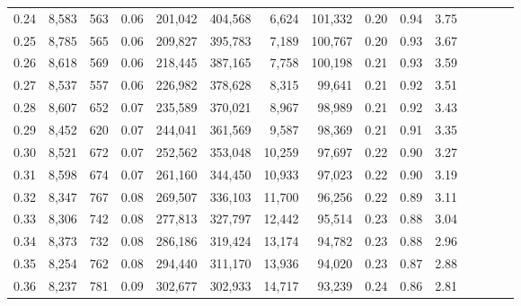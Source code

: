 \begin{tabular}{rrrcrrrrrrrrrrr}
0.24 &  8,583 &    563 &                                       0.06 &  201,042 &  404,568 &    6,624 &  101,332 &  0.20 &  0.94 &                         3.75 \\
0.25 &  8,785 &    565 &                                       0.06 &  209,827 &  395,783 &    7,189 &  100,767 &  0.20 &  0.93 &                         3.67 \\
0.26 &  8,618 &    569 &                                       0.06 &  218,445 &  387,165 &    7,758 &  100,198 &  0.21 &  0.93 &                         3.59 \\
0.27 &  8,537 &    557 &                                       0.06 &  226,982 &  378,628 &    8,315 &   99,641 &  0.21 &  0.92 &                         3.51 \\
0.28 &  8,607 &    652 &                                       0.07 &  235,589 &  370,021 &    8,967 &   98,989 &  0.21 &  0.92 &                         3.43 \\
0.29 &  8,452 &    620 &                                       0.07 &  244,041 &  361,569 &    9,587 &   98,369 &  0.21 &  0.91 &                         3.35 \\
0.30 &  8,521 &    672 &                                       0.07 &  252,562 &  353,048 &   10,259 &   97,697 &  0.22 &  0.90 &                         3.27 \\
0.31 &  8,598 &    674 &                                       0.07 &  261,160 &  344,450 &   10,933 &   97,023 &  0.22 &  0.90 &                         3.19 \\
0.32 &  8,347 &    767 &                                       0.08 &  269,507 &  336,103 &   11,700 &   96,256 &  0.22 &  0.89 &                         3.11 \\
0.33 &  8,306 &    742 &                                       0.08 &  277,813 &  327,797 &   12,442 &   95,514 &  0.23 &  0.88 &                         3.04 \\
0.34 &  8,373 &    732 &                                       0.08 &  286,186 &  319,424 &   13,174 &   94,782 &  0.23 &  0.88 &                         2.96 \\
0.35 &  8,254 &    762 &                                       0.08 &  294,440 &  311,170 &   13,936 &   94,020 &  0.23 &  0.87 &                         2.88 \\
0.36 &  8,237 &    781 &                                       0.09 &  302,677 &  302,933 &   14,717 &   93,239 &  0.24 &  0.86 &                         2.81 \\

\end{tabular}
